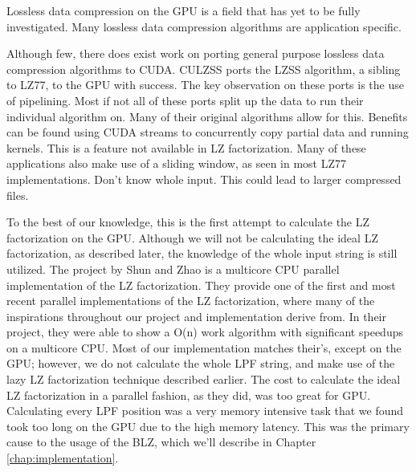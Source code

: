 Lossless data compression on the GPU is a field that has yet to be fully investigated.
Many lossless data compression algorithms are application specific.

Although few, there does exist work on porting general purpose lossless data compression algorithms to CUDA.
CULZSS ports the LZSS algorithm, a sibling to LZ77, to the GPU with success.
The key observation on these ports is the use of pipelining.
Most if not all of these ports split up the data to run their individual algorithm on.
Many of their original algorithms allow for this.
Benefits can be found using CUDA streams to concurrently copy partial data and running kernels.
This is a feature not available in LZ factorization.
Many of these applications also make use of a sliding window, as seen in most LZ77 implementations.
Don't know whole input.
This could lead to larger compressed files.


To the best of our knowledge, this is the first attempt to calculate the LZ factorization on the GPU.
Although we will not be calculating the ideal LZ factorization, as described later, the knowledge of the whole input string is still utilized.
The project by Shun and Zhao\cite{shun2013practical} is a multicore CPU parallel implementation of the LZ factorization.
They provide one of the first and most recent parallel implementations of the LZ factorization, where many of the inspirations throughout our project and implementation derive from.
In their project, they were able to show a O(n) work algorithm with significant speedups on a multicore CPU.
Most of our implementation matches their's, except on the GPU; however, we do not calculate the whole LPF string, and make use of the lazy LZ factorization technique described earlier.
The cost to calculate the ideal LZ factorization in a parallel fashion, as they did, was too great for GPU.
Calculating every LPF position was a very memory intensive task that we found took too long on the GPU due to the high memory latency.
This was the primary cause to the usage of the BLZ, which we'll describe in Chapter \ref{chap:implementation}.


